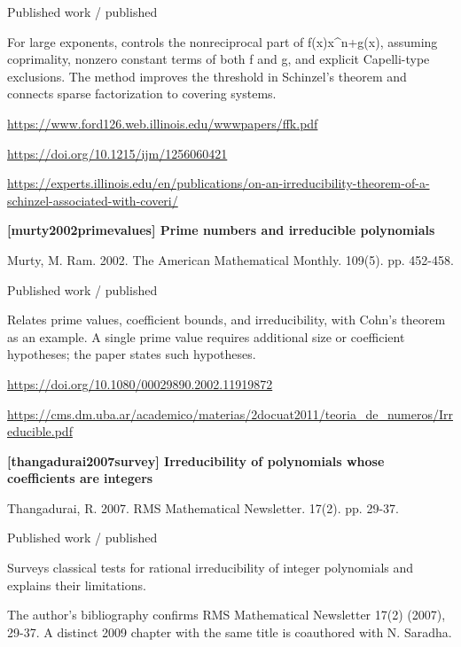\documentclass[11pt,a4paper,oneside,openany]{book}
\begin{document}
{\small\sffamily\color{atlasgold}Published work / published}\par
\color{black} For large exponents, controls the nonreciprocal part of f(x)x\textasciicircum{}n+g(x), assuming coprimality, nonzero constant terms of both f and g, and explicit Capelli-type exclusions. The method improves the threshold in Schinzel's theorem and connects sparse factorization to covering systems.\par
{\footnotesize\url{https://www.ford126.web.illinois.edu/wwwpapers/ffk.pdf}}\par
{\footnotesize\url{https://doi.org/10.1215/ijm/1256060421}}\par
{\footnotesize\url{https://experts.illinois.edu/en/publications/on-an-irreducibility-theorem-of-a-schinzel-associated-with-coveri/}}\par
\vspace{9pt}
\hypertarget{ref:murty2002primevalues}{}
{\sffamily\bfseries\color{atlasgreen}[murty2002primevalues] Prime numbers and irreducible polynomials}\par
\color{black} Murty, M. Ram. 2002. The American Mathematical Monthly. 109(5). pp. 452-458.\par
{\small\sffamily\color{atlasgold}Published work / published}\par
\color{black} Relates prime values, coefficient bounds, and irreducibility, with Cohn's theorem as an example. A single prime value requires additional size or coefficient hypotheses; the paper states such hypotheses.\par
{\footnotesize\url{https://doi.org/10.1080/00029890.2002.11919872}}\par
{\footnotesize\url{https://cms.dm.uba.ar/academico/materias/2docuat2011/teoria_de_numeros/Irreducible.pdf}}\par
\vspace{9pt}
\hypertarget{ref:thangadurai2007survey}{}
{\sffamily\bfseries\color{atlasgreen}[thangadurai2007survey] Irreducibility of polynomials whose coefficients are integers}\par
\color{black} Thangadurai, R. 2007. RMS Mathematical Newsletter. 17(2). pp. 29-37.\par
{\small\sffamily\color{atlasgold}Published work / published}\par
\color{black} Surveys classical tests for rational irreducibility of integer polynomials and explains their limitations.\par
{\small The author's bibliography confirms RMS Mathematical Newsletter 17(2) (2007), 29-37. A distinct 2009 chapter with the same title is coauthored with N. Saradha.}\par
\end{document}

